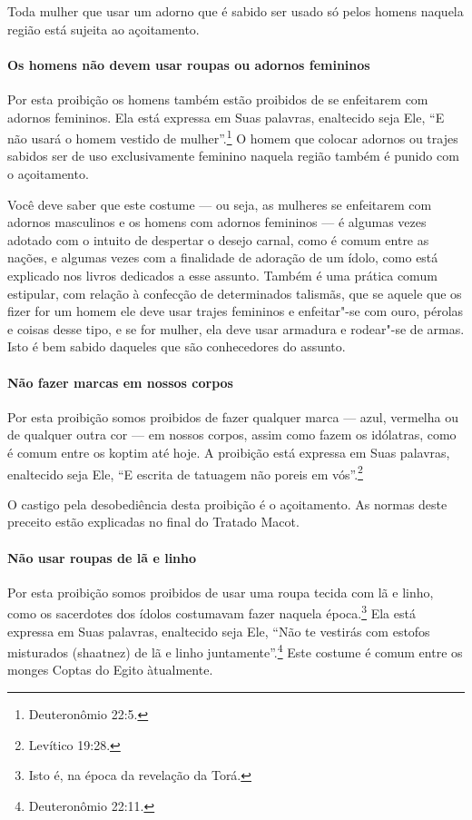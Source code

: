\begin{multicols}{2}
Toda mulher que usar um adorno que é sabido ser usado só pelos homens
naquela região está sujeita ao açoitamento.

\paragraph{Os homens não devem usar roupas ou adornos femininos}

Por esta proibição os homens também estão proibidos de se enfeitarem
com adornos femininos. Ela está expressa em Suas palavras, enaltecido
seja Ele, ``E não usará o homem vestido de mulher''.\footnote{Deuteronômio
22:5.} O homem que colocar adornos ou trajes sabidos ser de uso
exclusivamente feminino naquela região também é punido com o
açoitamento.

Você deve saber que este costume --- ou seja, as mulheres se enfeitarem
com adornos masculinos e os homens com adornos femininos --- é algumas
vezes adotado com o intuito de despertar o desejo carnal, como é comum
entre as nações, e algumas vezes com a finalidade de adoração de um
ídolo, como está explicado nos livros dedicados a esse assunto. Também é
uma prática comum estipular, com relação à confecção de determinados
talismãs, que se aquele que os fizer for um homem ele deve usar trajes
femininos e enfeitar"-se com ouro, pérolas e coisas desse tipo, e se for
mulher, ela deve usar armadura e rodear"-se de armas. Isto é bem sabido
daqueles que são conhecedores do assunto.

\paragraph{Não fazer marcas em nossos corpos}

Por esta proibição somos proibidos de fazer qualquer marca --- azul,
vermelha ou de qualquer outra cor --- em nossos corpos, assim como fazem
os idólatras, como é comum entre os koptim\starr{} até hoje. A proibição está
expressa em Suas palavras, enaltecido seja Ele, ``E escrita de tatuagem
não poreis em vós''.\footnote{Levítico 19:28.}

O castigo pela desobediência desta proibição é o açoitamento. As normas
deste preceito estão explicadas no final do Tratado Macot\starr.

\paragraph{Não usar roupas de lã e linho}

Por esta proibição somos proibidos de usar uma roupa tecida com lã e
linho, como os sacerdotes dos ídolos costumavam fazer naquela
época.\footnote{Isto é, na época da revelação da Torá\starr.} Ela está expressa em Suas palavras,
enaltecido seja Ele, ``Não te vestirás com estofos misturados (shaatnez\starr)
de lã e linho juntamente''.\footnote{Deuteronômio 22:11.} Este costume é comum
entre os monges Coptas do Egito àtualmente.


\end{multicols}

